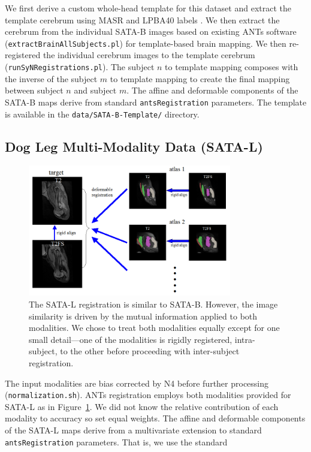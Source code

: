 \documentclass{llncs}
\begin{document}
We first derive a custom whole-head template for this dataset and
extract the template cerebrum using MASR and LPBA40 labels \cite{Shattuck2008}.
We then extract the cerebrum from the individual SATA-B images based
on existing ANTs software (\texttt{extractBrainAllSubjects.pl}) for
template-based brain mapping.  We then re-registered the individual
cerebrum images to the template cerebrum
(\texttt{runSyNRegistrations.pl}).  The subject $n$ to template
mapping composes with the inverse of the subject $m$ to template
mapping to create the final mapping between subject $n$ and subject $m$.
The affine and deformable components of the SATA-B maps derive from
standard \texttt{antsRegistration} parameters.  The template is
available in the \texttt{data/SATA-B-Template/} directory.
 
\subsection{Dog Leg Multi-Modality Data (SATA-L)}
\begin{figure}[t]
 \centering 
  \includegraphics[width=3.5in]{../figs/canine-leg-registration.png}
 \caption{The SATA-L registration is similar to SATA-B.  However, the
image similarity is driven by the mutual information applied to both
modalities.  We chose to treat both modalities equally except for one
small detail---one of the modalities is rigidly registered,
intra-subject, to the other before proceeding with inter-subject
registration.}
 \label{fig:Lmethods}
\end{figure}
The input modalities are
bias corrected by N4 \cite{Tustison2010} before further processing (\texttt{normalization.sh}).  ANTs
registration employs both modalities provided for SATA-L as in Figure~\ref{fig:Lmethods}.  We did not
know the relative contribution of each modality to accuracy so set
equal weights.  The affine and deformable components of the SATA-L
maps derive from a multivariate extension to standard
\texttt{antsRegistration} parameters.  That is, we use the standard
\end{document}
